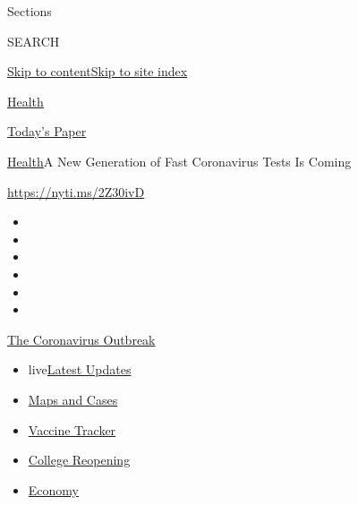 Sections

SEARCH

\protect\hyperlink{site-content}{Skip to
content}\protect\hyperlink{site-index}{Skip to site index}

\href{https://www.nytimes.com/section/health}{Health}

\href{https://myaccount.nytimes.com/auth/login?response_type=cookie\&client_id=vi}{}

\href{https://www.nytimes.com/section/todayspaper}{Today's Paper}

\href{/section/health}{Health}\textbar{}A New Generation of Fast
Coronavirus Tests Is Coming

\url{https://nyti.ms/2Z30ivD}

\begin{itemize}
\item
\item
\item
\item
\item
\item
\end{itemize}

\href{https://www.nytimes.com/news-event/coronavirus?action=click\&pgtype=Article\&state=default\&region=TOP_BANNER\&context=storylines_menu}{The
Coronavirus Outbreak}

\begin{itemize}
\tightlist
\item
  live\href{https://www.nytimes.com/2020/08/04/world/coronavirus-cases.html?action=click\&pgtype=Article\&state=default\&region=TOP_BANNER\&context=storylines_menu}{Latest
  Updates}
\item
  \href{https://www.nytimes.com/interactive/2020/us/coronavirus-us-cases.html?action=click\&pgtype=Article\&state=default\&region=TOP_BANNER\&context=storylines_menu}{Maps
  and Cases}
\item
  \href{https://www.nytimes.com/interactive/2020/science/coronavirus-vaccine-tracker.html?action=click\&pgtype=Article\&state=default\&region=TOP_BANNER\&context=storylines_menu}{Vaccine
  Tracker}
\item
  \href{https://www.nytimes.com/2020/08/02/us/covid-college-reopening.html?action=click\&pgtype=Article\&state=default\&region=TOP_BANNER\&context=storylines_menu}{College
  Reopening}
\item
  \href{https://www.nytimes.com/live/2020/08/04/business/stock-market-today-coronavirus?action=click\&pgtype=Article\&state=default\&region=TOP_BANNER\&context=storylines_menu}{Economy}
\end{itemize}

